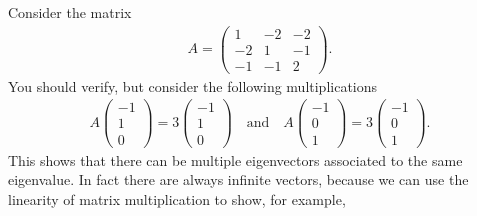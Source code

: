 

\noindent Consider the matrix
\begin{align*}
A = 
\begin{pmatrix}
  1 & -2 & -2 \\
 -2 &  1 & -1 \\
 -1 & -1 &  2
\end{pmatrix}.
\end{align*}
You should verify, but consider the following multiplications
\begin{align*}
A \begin{pmatrix} -1 \\ 1 \\ 0 \end{pmatrix} = 3 \begin{pmatrix} -1 \\ 1 \\ 0 \end{pmatrix} \quad \text{and} \quad
A \begin{pmatrix} -1 \\ 0 \\ 1 \end{pmatrix} = 3 \begin{pmatrix} -1 \\ 0 \\ 1 \end{pmatrix}.
\end{align*}
This shows that there can be multiple eigenvectors associated to the same eigenvalue. In fact there are always infinite vectors, because we can use the linearity of matrix multiplication to show, for example,
